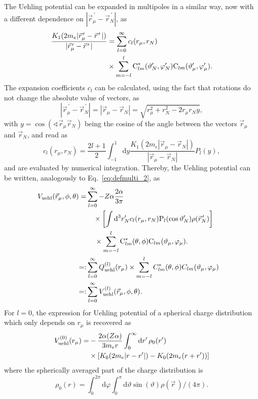 The Uehling potential can be expanded in multipoles in a similar way, now with a different dependence on $|\vec{r}_\mu^{\,\prime}-\vec{r}_N^{\,\prime}|$, as
\begin{align}
\frac{K_1(2m_e{|\vec{r}_\mu^{\,\prime} - \vec{r}^{\,\prime}\,|})}{|\vec{r}_\mu^{\,\prime} - \vec{r}^{\,\prime}\,|}
&=\sum_{l=0}^\infty c_l(r_\mu,r_N)\\
&\times\sum_{m=-l}^l \text{C}^*_{lm}(\vartheta_N^{\prime},\varphi_N^{\prime})\text{C}_{lm}(\vartheta_\mu^\prime,\varphi_\mu^\prime).\notag
\end{align}
The expansion coefficients $c_l$ can be calculated, using the fact that rotations do not change the absolute value of vectors, as
\begin{equation}
|\vec{r}_\mu^{\,\prime} - \vec{r}_N^{\,\prime}|
=|\vec{r}_\mu - \vec{r}_N|
=\sqrt{r_\mu^2 + r_N^2 - 2 r_\mu r_N y},
\end{equation}
with ${y}{=}{\cos(\sphericalangle \vec{r}_\mu\vec{r}_N)}$ being the cosine of the angle between the vectors $\vec{r}_\mu$ and $\vec{r}_N$, and read as
\begin{equation}
c_l(r_\mu,r_N)=\frac{2l+1}{2} \int_{-1}^1 \text{d}y \frac{K_1(2m_e{|\vec{r}_\mu - \vec{r}_N|})}{|\vec{r}_\mu - \vec{r}_N|} P_l(y),
\label{eq:defcl}
\end{equation}
and are evaluated by numerical integration.
Thereby, the Uehling potential can be written, analogously to Eq.~\eqref{eq:defmulti_2}, as
\begin{align}
V_{\text{uehl}}(\vec{r}_\mu,\phi,\theta)=&\sum_{l=0}^\infty-Z\alpha\frac{2\alpha}{3\pi} \notag\\
&\quad\times\left[ \int \text{d}^3r^{\prime}_N c_l(r_\mu,r_N)\text{P}_{l}(\cos \vartheta_N^{\prime})\rho(\vec{r}_N^{\,\prime})\right]\notag\\
&\quad\,\times \sum_{m=-l}^l \text{C}^*_{lm}(\theta,\phi)\text{C}_{lm}(\vartheta_\mu,\varphi_\mu).\notag\\
=:&\sum_{l=0}^\infty Q^{(l)}_{\text{uehl}}(r_\mu)\times\sum_{m=-l}^lC^*_{lm}(\theta,\phi)C_{lm}(\vartheta_\mu,\varphi_\mu)&\notag\\
=:& \sum_{l=0}^\infty V^{(l)}_{\text{uehl}}(\vec{r}_\mu,\phi,\theta).
\label{eq:defmultiuehl}
\end{align}
For $l=0$, the expression for Uehling potential of a spherical charge distribution~\cite{Fullerton1976} which only depends on $r_\mu$ is recovered as
\begin{align}
\label{eq:sph_uehl}
V^{(0)}_{\text{uehl}}(r_\mu)=& -\frac{2\alpha (Z\alpha)}{3 m_e r}\int_0^\infty \text{d}r^{\prime}\,\rho_0(r^\prime)\\
&\times\left[K_0(2m_e|r-r^\prime|)-K_0(2m_e(r+r^\prime))\right]\notag
\end{align}
where the spherically averaged part of the charge distribution is
\begin{equation}
\rho_0(r)=\int_0^{2\pi}\text{d}\varphi\int_0^\pi\text{d}\vartheta \sin(\vartheta)\rho(\vec{r}\,)/(4\pi).
\end{equation}
%
%
